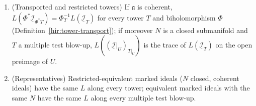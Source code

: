 \begin{proposition}
\begin{enumerate}
followed by \(\pi\), \(z\in L(\underline{\mathcal I}_{T\pi})\) if and only if \(\pi(z)\in L(\underline{\mathcal I}_T)\) whenever \(\pi(z)\notin C\) (\(N\) a closed submanifold,
\(\mathfrak a\) coherent, closed members).
\item (Transported and restricted towers) If \(\mathfrak a\) is coherent, \(L(\Phi^*\underline{\mathcal I}_{\Phi^*T})=\Phi_T^{-1}L(\underline{\mathcal I}_T)\) for every tower \(T\) and
biholomorphism \(\Phi\) (Definition~\ref{hir:tower-transport}); if moreover \(N\) is a closed submanifold and \(T\) a multiple test blow-up, \(L((\underline{\mathcal I}|_U)_{T|_U})\)
is the trace of \(L(\underline{\mathcal I}_T)\) on the open preimage of \(U\).
\item (Representatives) Restricted-equivalent marked ideals (\(N\) closed, coherent ideals) have the same \(L\) along every tower; equivalent marked ideals with
the same \(N\) have the same \(L\) along every multiple test blow-up.
\end{enumerate}
\end{proposition}
